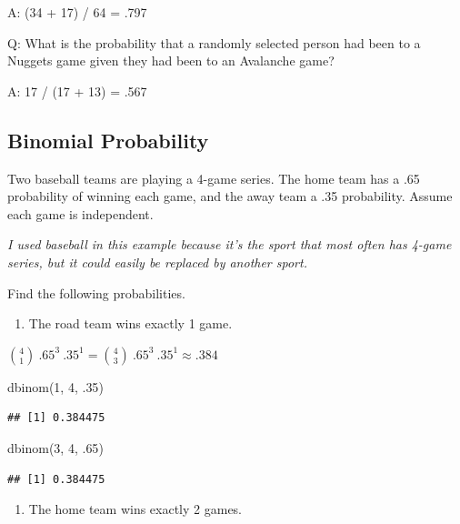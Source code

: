 \documentclass[
]{book}
\newenvironment{Shaded}{\begin{snugshade}}{\end{snugshade}}
\newcommand{\DecValTok}[1]{\textcolor[rgb]{0.00,0.00,0.81}{#1}}
\newcommand{\FunctionTok}[1]{\textcolor[rgb]{0.00,0.00,0.00}{#1}}
\newcommand{\NormalTok}[1]{#1}
\providecommand{\tightlist}{%
  \setlength{\itemsep}{0pt}\setlength{\parskip}{0pt}}
\theoremstyle{definition}
\theoremstyle{definition}
\theoremstyle{definition}
\theoremstyle{definition}
\theoremstyle{remark}
\begin{document}
A: (34 + 17) / 64 = .797

Q: What is the probability that a randomly selected person had been to a Nuggets game given they had been to an Avalanche game?

A: 17 / (17 + 13) = .567

\hypertarget{binomial-probability}{%
\subsection{Binomial Probability}\label{binomial-probability}}

Two baseball teams are playing a 4-game series. The home team has a .65 probability of winning each game, and the away team a .35 probability. Assume each game is independent.

\emph{I used baseball in this example because it's the sport that most often has 4-game series, but it could easily be replaced by another sport.}

Find the following probabilities.

\begin{enumerate}
\def\labelenumi{(\alph{enumi})}
\tightlist
\item
  The road team wins exactly 1 game.
\end{enumerate}

\(\binom{4}{1}\ .65^3\ .35^1 = \binom{4}{3}\ .65^3\ .35^1 \approx .384\)

\begin{Shaded}
\begin{Highlighting}[]
\FunctionTok{dbinom}\NormalTok{(}\DecValTok{1}\NormalTok{, }\DecValTok{4}\NormalTok{, .}\DecValTok{35}\NormalTok{)}
\end{Highlighting}
\end{Shaded}

\begin{verbatim}
## [1] 0.384475
\end{verbatim}

\begin{Shaded}
\begin{Highlighting}[]
\FunctionTok{dbinom}\NormalTok{(}\DecValTok{3}\NormalTok{, }\DecValTok{4}\NormalTok{, .}\DecValTok{65}\NormalTok{)}
\end{Highlighting}
\end{Shaded}

\begin{verbatim}
## [1] 0.384475
\end{verbatim}

\begin{enumerate}
\def\labelenumi{(\alph{enumi})}
\setcounter{enumi}{1}
\tightlist
\item
  The home team wins exactly 2 games.
\end{enumerate}
\end{document}
